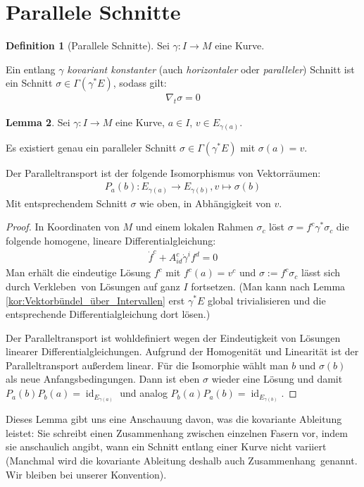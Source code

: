 \documentclass[a4paper]{scrreprt}
\numberwithin{equation}{chapter}
\DeclareMathOperator{\id}{id}
\theoremstyle{definition}
\newtheorem{defn}{Definition}[section]
\newtheorem{lemma}[defn]{Lemma}
\begin{document}
	\section{Parallele Schnitte}
		\begin{defn}[Parallele Schnitte]
			Sei $\gamma\colon I\rightarrow M$ eine Kurve.
			
			Ein entlang $\gamma$ \emph{kovariant konstanter} (auch \emph{horizontaler} oder \emph{paralleler}) Schnitt ist ein Schnitt $\sigma\in\Gamma(\gamma^*E)$, sodass gilt:
			\begin{align*}
				\nabla_t\sigma=0
			\end{align*}
		\end{defn}
		\begin{lemma}
			Sei $\gamma\colon I\rightarrow M$ eine Kurve, $a\in I$, $v\in E_{\gamma(a)}$.
			
			Es existiert genau ein paralleler Schnitt $\sigma\in \Gamma(\gamma^*E)$ mit $\sigma(a)=v$.
			
			Der Paralleltransport ist der folgende Isomorphismus von Vektorräumen:
			\begin{align*}
				P_{a}(b)\colon E_{\gamma(a)}\rightarrow E_{\gamma(b)}, v\mapsto \sigma(b)
			\end{align*}
			Mit entsprechendem Schnitt $\sigma$ wie oben, in Abhängigkeit von $v$.
			\begin{proof}
				In Koordinaten von $M$ und einem lokalen Rahmen $\sigma_c$ löst $\sigma=f^c\gamma^*\sigma_c$ die folgende homogene, lineare Differentialgleichung:
				\begin{align*}
					\dot{f}^c+A^c_{id}\dot{\gamma}^i f^d=0
				\end{align*}
				Man erhält die eindeutige Lösung $f^c$ mit $f^c(a)=v^c$ und $\sigma:=f^c\sigma_c$ lässt sich durch \glqq Verkleben\grqq\ von Lösungen auf ganz $I$ fortsetzen. (Man kann nach Lemma \ref{kor:Vektorbündel_über_Intervallen} erst $\gamma^*E$ global trivialisieren und die entsprechende Differentialgleichung dort lösen.)
				
				Der Paralleltransport ist wohldefiniert wegen der Eindeutigkeit von Lösungen linearer Differentialgleichungen. Aufgrund der Homogenität und Linearität ist der Paralleltransport außerdem linear. Für die Isomorphie wählt man $b$ und $\sigma(b)$ als neue Anfangsbedingungen. Dann ist eben $\sigma$ wieder eine Lösung und damit $P_a(b)P_b(a)=\id_{E_{\gamma(a)}}$ und analog $P_b(a)P_a(b)=\id_{E_{\gamma(b)}}$.
			\end{proof}
		\end{lemma}
		Dieses Lemma gibt uns eine Anschauung davon, was die kovariante Ableitung leistet: Sie schreibt einen Zusammenhang zwischen einzelnen Fasern vor, indem sie anschaulich angibt, wann ein Schnitt entlang einer Kurve nicht variiert (Manchmal wird die kovariante Ableitung deshalb auch \glqq Zusammenhang\grqq\ genannt. Wir bleiben bei unserer Konvention).
		
\end{document}
